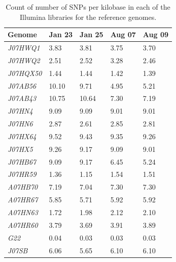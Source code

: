 
\begin{table}[ht]
  \caption{Count of number of SNPs per kilobase in each of the Illumina libraries for the reference genomes.}
  \begin{tabularx}{\textwidth}{L{2.2cm}R{2cm}R{3cm}R{3.2cm}R{2cm}}
  \hline
    \textbf{Genome} & \textbf{Jan 23} & \textbf{Jan 25} & \textbf{Aug 07} & \textbf{Aug 09} \\
    \hline
     \textit{J07HWQ1} & 3.83 & 3.81 & 3.75 & 3.70 \\
     \textit{J07HWQ2} & 2.51 & 2.52 & 3.28 & 2.46 \\
     \textit{J07HQX50} & 1.44 & 1.44 & 1.42 & 1.39 \\
     \textit{J07AB56} & 10.10 & 9.71 & 4.95 & 5.21 \\
     \textit{J07AB43} & 10.75 & 10.64 & 7.30 & 7.19 \\
     \textit{J07HN4} & 9.09 & 9.09 & 9.01 & 9.01 \\
     \textit{J07HN6} & 2.87 & 2.61 & 2.85 & 2.81 \\
     \textit{J07HX64} & 9.52 & 9.43 & 9.35 & 9.26 \\
     \textit{J07HX5} & 9.26 & 9.17 & 9.09 & 9.01 \\
     \textit{J07HB67} & 9.09 & 9.17 & 6.45 & 5.24 \\
     \textit{J07HR59} & 1.36 & 1.15 & 1.54 & 1.51 \\
     \textit{A07HB70} & 7.19 & 7.04 & 7.30 & 7.30 \\
     \textit{A07HR67} & 5.85 & 5.71 & 5.92 & 5.92 \\
     \textit{A07HN63} & 1.72 & 1.98 & 2.12 & 2.10 \\
     \textit{A07HR60} & 3.79 & 3.69 & 3.91 & 3.89 \\
     \textit{G22} & 0.04 & 0.03 & 0.03 & 0.03 \\
     \textit{J07SB} & 6.06 & 5.65 & 6.10 & 6.10 \\     
  \end{tabularx}
  \label{SNPS_KB}
\end{table}


